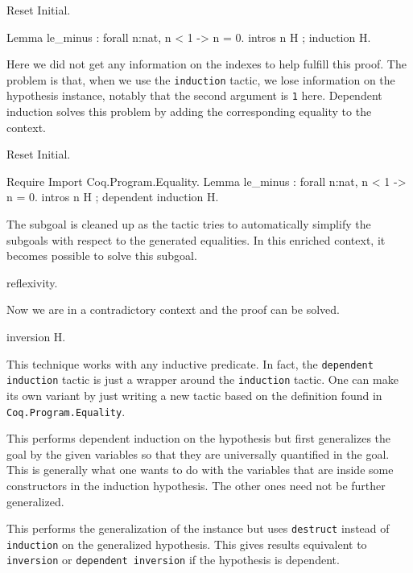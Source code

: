 \Example

\begin{coq_eval}
Reset Initial.
\end{coq_eval}
\begin{coq_example}
Lemma le_minus : forall n:nat, n < 1 -> n = 0.
intros n H ; induction H.
\end{coq_example}

Here we did not get any information on the indexes to help fulfill this
proof. The problem is that, when we use the \texttt{induction} tactic,
we lose information on the hypothesis instance, notably that the second
argument is \texttt{1} here. Dependent induction solves this problem by
adding the corresponding equality to the context.

\begin{coq_eval}
Reset Initial.
\end{coq_eval}
\begin{coq_example}
Require Import Coq.Program.Equality.
Lemma le_minus : forall n:nat, n < 1 -> n = 0.
intros n H ; dependent induction H.
\end{coq_example}

The subgoal is cleaned up as the tactic tries to automatically
simplify the subgoals with respect to the generated equalities.
In this enriched context, it becomes possible to solve this subgoal.
\begin{coq_example}
reflexivity.
\end{coq_example}

Now we are in a contradictory context and the proof can be solved.
\begin{coq_example}
inversion H.
\end{coq_example}

This technique works with any inductive predicate.
In fact, the \texttt{dependent induction} tactic is just a wrapper around
the \texttt{induction} tactic. One can make its own variant by just
writing a new tactic based on the definition found in
\texttt{Coq.Program.Equality}.

\begin{Variants}
\item {}

  This performs dependent induction on the hypothesis {\ident} but first
  generalizes the goal by the given variables so that they are
  universally quantified in the goal. This is generally what one wants
  to do with the variables that are inside some constructors in the
  induction hypothesis. The other ones need not be further generalized.

\item {}

  This performs the generalization of the instance {\ident} but uses {\tt destruct}
  instead of {\tt induction} on the generalized hypothesis. This gives
  results equivalent to {\tt inversion} or {\tt dependent inversion} if
  the hypothesis is dependent.
\end{Variants}

